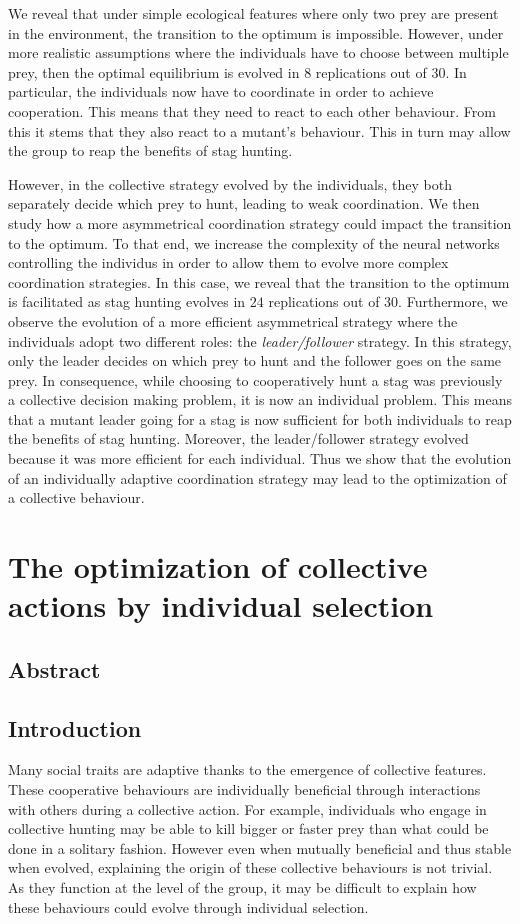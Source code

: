 We reveal that under simple ecological features where only two prey are present in the environment, the transition to the optimum is impossible. However, under more realistic assumptions where the individuals have to choose between multiple prey, then the optimal equilibrium is evolved in $8$ replications out of $30$. In particular, the individuals now have to coordinate in order to achieve cooperation. This means that they need to react to each other behaviour. From this it stems that they also react to a mutant's behaviour. This in turn may allow the group to reap the benefits of stag hunting. 

However, in the collective strategy evolved by the individuals, they both separately decide which prey to hunt, leading to weak coordination. We then study how a more asymmetrical coordination strategy could impact the transition to the optimum. To that end, we increase the complexity of the neural networks controlling the individus in order to allow them to evolve more complex coordination strategies. In this case, we reveal that the transition to the optimum is facilitated as stag hunting evolves in $24$ replications out of $30$. Furthermore, we observe the evolution of a more efficient asymmetrical strategy where the individuals adopt two different roles: the \emph{leader/follower} strategy. In this strategy, only the leader decides on which prey to hunt and the follower goes on the same prey. In consequence, while choosing to cooperatively hunt a stag was previously a collective decision making problem, it is now an individual problem. This means that a mutant leader going for a stag is now sufficient for both individuals to reap the benefits of stag hunting. Moreover, the leader/follower strategy evolved because it was more efficient for each individual. Thus we show that the evolution of an individually adaptive coordination strategy may lead to the optimization of a collective behaviour.

\clearpage


\chapter{The optimization of collective actions by individual selection}

\section{Abstract}


\section{Introduction}
  Many social traits are adaptive thanks to the emergence of collective features. These cooperative behaviours are individually beneficial through interactions with others during a collective action. For example, individuals who engage in collective hunting may be able to kill bigger or faster prey than what could be done in a solitary fashion. However even when mutually beneficial and thus stable when evolved, explaining the origin of these collective behaviours is not trivial. As they function at the level of the group, it may be difficult to explain how these behaviours could evolve through individual selection.

